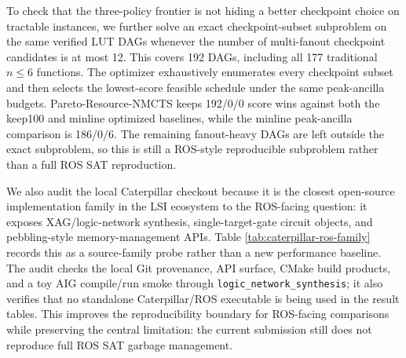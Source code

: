 \documentclass[11pt]{article}
\newcommand{\method}{Resource-NMCTS}
\begin{document}
\begin{table}[H]
\centering
\small
\caption{ROS-style LUT garbage budget frontier over verified best-K LUT DAGs.
The frontier selects among executable proxy schedules under relative
peak-ancilla budgets; it is not the official ROS SAT garbage-management flow.}
\label{tab:ros-garbage-budget-frontier}

\end{table}

To check that the three-policy frontier is not hiding a better checkpoint
choice on tractable instances, we further solve an exact checkpoint-subset
subproblem on the same verified LUT DAGs whenever the number of multi-fanout
checkpoint candidates is at most 12.  This covers 192 DAGs, including all 177
traditional $n\leq6$ functions.  The optimizer exhaustively enumerates every
checkpoint subset and then selects the lowest-score feasible schedule under
the same peak-ancilla budgets.  Pareto-\method{} keeps 192/0/0 score wins
against both the keep100 and minline optimized baselines, while the minline
peak-ancilla comparison is 186/0/6.  The remaining fanout-heavy DAGs are left
outside the exact subproblem, so this is still a ROS-style reproducible
subproblem rather than a full ROS SAT reproduction.

\begin{table}[H]
\centering
\small
\caption{Exact checkpoint-subset optimizer for tractable ROS-style LUT DAGs.
The optimizer exhaustively enumerates checkpoint subsets for DAGs with at most
12 multi-fanout candidates.  It covers all traditional $n\leq6$ functions but
does not reproduce the full ROS SAT garbage-management flow.}
\label{tab:ros-checkpoint-optimizer}

\end{table}

We also audit the local Caterpillar checkout because it is the closest
open-source implementation family in the LSI ecosystem to the ROS-facing
question: it exposes XAG/logic-network synthesis, single-target-gate circuit
objects, and pebbling-style memory-management APIs.  Table
\ref{tab:caterpillar-ros-family} records this as a source-family probe rather
than a new performance baseline.  The audit checks the local Git provenance, API
surface, CMake build products, and a toy AIG compile/run smoke through
\texttt{logic\_network\_synthesis}; it also verifies that no standalone
Caterpillar/ROS executable is being used in the result tables.  This improves
the reproducibility boundary for ROS-facing comparisons while preserving the
central limitation: the current submission still does not reproduce full ROS
SAT garbage management.
\end{document}
